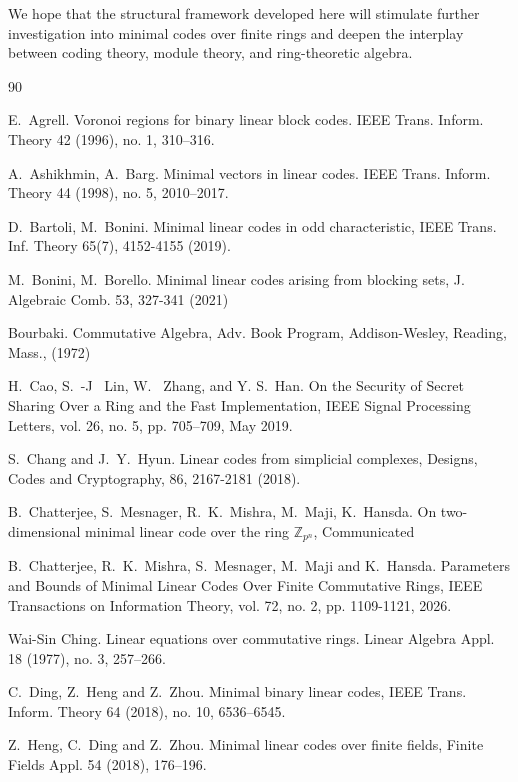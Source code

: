 \documentclass[10pt]{article}
\theoremstyle{definition}
\begin{document}
\medskip

We hope that the structural framework developed here will stimulate further investigation into minimal codes over finite rings and deepen the interplay between coding theory, module theory, and ring-theoretic algebra.


\begin{thebibliography}{90}

E.~Agrell. Voronoi regions for binary linear block codes. IEEE Trans. Inform. Theory 42 (1996), no. 1, 310--316.

A.~Ashikhmin, A.~Barg. Minimal vectors in linear codes. IEEE Trans. Inform. Theory 44 (1998), no. 5, 2010--2017.

D.~Bartoli, M.~Bonini. Minimal linear codes in odd characteristic, IEEE Trans. Inf. Theory 65(7),  4152-4155 (2019).

M.~Bonini, M.~Borello. Minimal linear codes arising from blocking sets, J. Algebraic Comb. 53, 327-341 (2021)

Bourbaki. Commutative Algebra, Adv. Book Program, Addison-Wesley, Reading, Mass., (1972)

H.~Cao, S.~-J ~Lin, W.~ Zhang, and Y. S.~Han.  On the Security of Secret Sharing Over a Ring and the Fast Implementation, IEEE Signal Processing Letters, vol. 26, no. 5, pp. 705--709, May 2019.

S.~Chang and J.~Y.~Hyun. Linear codes from simplicial complexes, Designs, Codes and Cryptography, 86, 2167-2181 (2018).

B.~Chatterjee, S.~Mesnager, R.~K.~Mishra, M.~Maji, K.~Hansda. On two-dimensional minimal linear code over the ring $\mathbb{Z}_{p^n}$, Communicated

B.~Chatterjee, R.~K.~Mishra, S.~Mesnager, M.~Maji and K.~Hansda. Parameters and Bounds of Minimal Linear Codes Over Finite Commutative Rings, IEEE Transactions on Information Theory, vol. 72, no. 2, pp. 1109-1121, 2026.

Wai-Sin Ching. Linear equations over commutative rings. Linear Algebra Appl. 18 (1977), no. 3, 257--266.

C.~Ding, Z.~Heng and Z.~Zhou. Minimal binary linear codes, IEEE Trans. Inform. Theory 64 (2018), no. 10, 6536--6545.

Z.~Heng, C.~Ding and Z.~Zhou. Minimal linear codes over finite fields, Finite Fields Appl. 54 (2018), 176--196.


\end{thebibliography}
\end{document}
